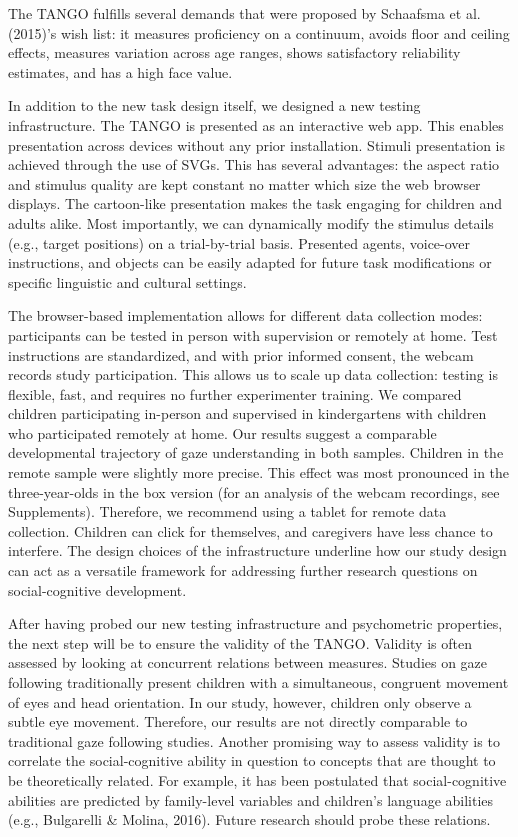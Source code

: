 \documentclass[
  man,floatsintext]{apa6}
\begin{document}
The TANGO fulfills several demands that were proposed by Schaafsma et al. (2015)'s wish list: it measures proficiency on a continuum, avoids floor and ceiling effects, measures variation across age ranges, shows satisfactory reliability estimates, and has a high face value.

In addition to the new task design itself, we designed a new testing infrastructure.
The TANGO is presented as an interactive web app.
This enables presentation across devices without any prior installation.
Stimuli presentation is achieved through the use of SVGs.
This has several advantages: the aspect ratio and stimulus quality are kept constant no matter which size the web browser displays.
The cartoon-like presentation makes the task engaging for children and adults alike.
Most importantly, we can dynamically modify the stimulus details (e.g., target positions) on a trial-by-trial basis.
Presented agents, voice-over instructions, and objects can be easily adapted for future task modifications or specific linguistic and cultural settings.

The browser-based implementation allows for different data collection modes: participants can be tested in person with supervision or remotely at home.
Test instructions are standardized, and with prior informed consent, the webcam records study participation.
This allows us to scale up data collection: testing is flexible, fast, and requires no further experimenter training.
We compared children participating in-person and supervised in kindergartens with children who participated remotely at home.
Our results suggest a comparable developmental trajectory of gaze understanding in both samples.
Children in the remote sample were slightly more precise.
This effect was most pronounced in the three-year-olds in the box version (for an analysis of the webcam recordings, see Supplements).
Therefore, we recommend using a tablet for remote data collection.
Children can click for themselves, and caregivers have less chance to interfere.
The design choices of the infrastructure underline how our study design can act as a versatile framework for addressing further research questions on social-cognitive development.

After having probed our new testing infrastructure and psychometric properties, the next step will be to ensure the validity of the TANGO.
Validity is often assessed by looking at concurrent relations between measures.
Studies on gaze following traditionally present children with a simultaneous, congruent movement of eyes and head orientation.
In our study, however, children only observe a subtle eye movement.
Therefore, our results are not directly comparable to traditional gaze following studies.
Another promising way to assess validity is to correlate the social-cognitive ability in question to concepts that are thought to be theoretically related.
For example, it has been postulated that social-cognitive abilities are predicted by family-level variables and children's language abilities (e.g., Bulgarelli \& Molina, 2016).
Future research should probe these relations.
\end{document}
